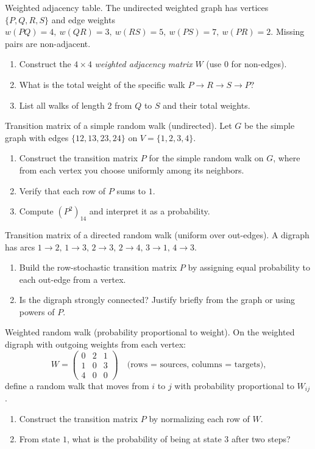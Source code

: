 \documentclass[11pt]{article}
\def\textbf#1{#1}%
\newcounter{question}
\begin{document}
\begin{question}
\textbf{Weighted adjacency table.}
The undirected weighted graph has vertices \(\{P,Q,R,S\}\) and edge weights  
\(w(PQ)=4,\ w(QR)=3,\ w(RS)=5,\ w(PS)=7,\ w(PR)=2\). Missing pairs are non-adjacent.
\begin{enumerate}
  \item Construct the \(4\times4\) \emph{weighted adjacency matrix} \(W\) (use 0 for non-edges).
  \item What is the total weight of the specific walk \(P\to R\to S\to P\)?
  \item List all walks of length \(2\) from \(Q\) to \(S\) and their total weights.
\end{enumerate}
\end{question}

\begin{question}
\textbf{Transition matrix of a simple random walk (undirected).}
Let \(G\) be the simple graph with edges \(\{12,13,23,24\}\) on \(V=\{1,2,3,4\}\).
\begin{enumerate}
  \item Construct the transition matrix \(P\) for the simple random walk on \(G\), where from each vertex you choose uniformly among its neighbors.
  \item Verify that each row of \(P\) sums to \(1\).
  \item Compute \((P^{2})_{14}\) and interpret it as a probability.
\end{enumerate}
\end{question}

\begin{question}
\textbf{Transition matrix of a directed random walk (uniform over out-edges).}
A digraph has arcs \(1\to2,\,1\to3,\,2\to3,\,2\to4,\,3\to1,\,4\to3\).
\begin{enumerate}
  \item Build the row-stochastic transition matrix \(P\) by assigning equal probability to each out-edge from a vertex.
  \item Is the digraph strongly connected? Justify briefly from the graph or using powers of \(P\).
\end{enumerate}
\end{question}

\begin{question}
\textbf{Weighted random walk (probability proportional to weight).}
On the weighted digraph with outgoing weights from each vertex:
\[
W=\begin{pmatrix}
0&2&1\\
1&0&3\\
4&0&0
\end{pmatrix}
\quad\text{(rows = sources, columns = targets),}
\]
define a random walk that moves from \(i\) to \(j\) with probability proportional to \(W_{ij}\).
\begin{enumerate}
  \item Construct the transition matrix \(P\) by normalizing each row of \(W\).
  \item From state \(1\), what is the probability of being at state \(3\) after two steps?
\end{enumerate}
\end{question}
\end{document}
